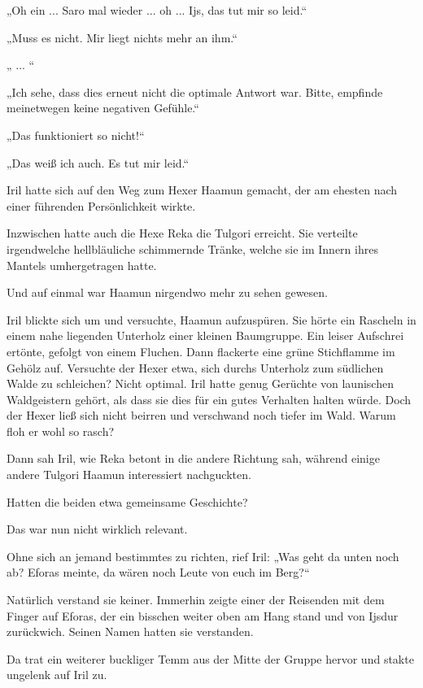 „Oh ein ... Saro mal wieder ... oh ... Ijs, das tut mir so leid.“

„Muss es nicht. Mir liegt nichts mehr an ihm.“

„ ... “

„Ich sehe, dass dies erneut nicht die optimale Antwort war. Bitte, empfinde meinetwegen keine negativen Gefühle.“

„Das funktioniert so nicht!“

„Das weiß ich auch. Es tut mir leid.“



\trennzeichen



Iril hatte sich auf den Weg zum Hexer Haamun gemacht, der am ehesten nach einer führenden Persönlichkeit wirkte.

Inzwischen hatte auch die Hexe Reka die Tulgori erreicht. Sie verteilte irgendwelche hellbläuliche schimmernde Tränke, welche sie im Innern ihres Mantels umhergetragen hatte.

Und auf einmal war Haamun nirgendwo mehr zu sehen gewesen.

Iril blickte sich um und versuchte, Haamun aufzuspüren. Sie hörte ein Rascheln in einem nahe liegenden Unterholz einer kleinen Baumgruppe. Ein leiser Aufschrei ertönte, gefolgt von einem Fluchen. Dann flackerte eine grüne Stichflamme im Gehölz auf. Versuchte der Hexer etwa, sich durchs Unterholz zum südlichen Walde zu schleichen? Nicht optimal. Iril hatte genug Gerüchte von launischen Waldgeistern gehört, als dass sie dies für ein gutes Verhalten halten würde. Doch der Hexer ließ sich nicht beirren und verschwand noch tiefer im Wald. Warum floh er wohl so rasch?

Dann sah Iril, wie Reka betont in die andere Richtung sah, während einige andere Tulgori Haamun interessiert nachguckten.

Hatten die beiden etwa gemeinsame Geschichte?

Das war nun nicht wirklich relevant.

Ohne sich an jemand bestimmtes zu richten, rief Iril: „Was geht da unten noch ab? Eforas meinte, da wären noch Leute von euch im Berg?“

Natürlich verstand sie keiner. Immerhin zeigte einer der Reisenden mit dem Finger auf Eforas, der ein bisschen weiter oben am Hang stand und von Ijsdur zurückwich. Seinen Namen hatten sie verstanden.

Da trat ein weiterer buckliger Temm aus der Mitte der Gruppe hervor und stakte ungelenk auf Iril zu.


